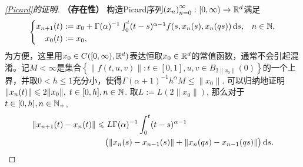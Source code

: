 \begin{proof}[\cref{Picard}的证明]
    \textbf{（存在性）} 构造Picard序列$\left(x_n\right)_{n=0}^\infty\colon [0,\infty)\to \mathbb{R}^d$满足
    \begin{equation}\label{PicardSequence}
        \left\{\begin{aligned}
            x_{n+1}(t)&:=x_0 + \Gamma(\alpha)^{-1} \textstyle\int_0^t (t-s)^{\alpha-1} f(s,x_n(s),x_n(qs))\mathop{}\!\mathrm{d} s, & n\in \mathbb{N},\\
            x_0(t)&:=x_0, & {}
        \end{aligned}\right.
    \end{equation}
    为方便，这里用$x_0\in C([0,\infty),\mathbb{R}^d)$表达恒取$x_0\in\mathbb{R}^d$的常值函数，通常不会引起混淆。记$M<\infty$是集合$\left\{\left\|f(t,u,v)\right\|\colon t\in [0,1], u,v\in B_{2\|x_0\|}(0)\right\}$的一个上界，并取$0<h\leqslant 1$充分小，使得$\Gamma(\alpha + 1)^{-1} h^\alpha M \leqslant \|x_0\|$. 可以归纳地证明$\left\|x_{n}(t)\right\|\leqslant 2\|x_0\|,\;t\in [0,h],n\in \mathbb{N}$. 取$L:=L(2\|x_0\|)$, 那么对于$t\in [0,h],n\in \mathbb{N_+}$,
    \begin{equation}\label{Picard估计递归}
        \begin{aligned}
            \left\| x_{n+1}(t)-x_n(t) \right\|&\leqslant L\Gamma(\alpha)^{-1}\int_0^t (t-s)^{\alpha-1} \\ &\relphantom{\leqslant}\bigl(\left\|x_n(s)-x_{n-1}(s)\right\| + \left\|x_n(qs)-x_{n-1}(qs)\right\|\bigr) \differential s.
        \end{aligned}
    \end{equation}


\end{proof}
